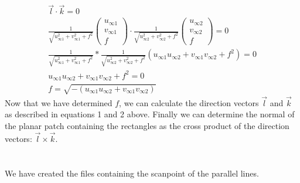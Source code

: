 \documentclass{article}
\begin{document}
\begin{align}
\vec{l} \cdot \vec{k}  = 0 \\
\frac{1}{\sqrt{u_{\infty 1}^2+v_{\infty 1}^2+f^2}}
\left(
\begin{array}{c}
u_{\infty 1} \\ v_{\infty 1} \\ f
\end{array}
\right) \cdot \frac{1}{\sqrt{u_{\infty 2}^2+v_{\infty 2}^2+f^2}}
\left(
\begin{array}{c}
u_{\infty 2} \\ v_{\infty 2} \\ f
\end{array}
\right)  = 0 \\
\frac{1}{\sqrt{u_{\infty 1}^2+v_{\infty 1}^2+f^2}} * \frac{1}{\sqrt{u_{\infty 2}^2+v_{\infty 2}^2+f^2}} (u_{\infty 1}u_{\infty 2}+v_{\infty 1}v_{\infty 2} + f^2) = 0 \\
u_{\infty 1}u_{\infty 2}+v_{\infty 1}v_{\infty 2} + f^2 = 0 \\
f = \sqrt{-(u_{\infty 1}u_{\infty 2}+v_{\infty 1}v_{\infty 2})}
\end{align}
Now that we have determined $f$, we can calculate the direction vectors $\vec{l}$ and $\vec{k}$ as described in equations 1 and 2 above. Finally we can determine the normal of the planar patch containing the rectangles as the cross product of the direction vectors: $\vec{l} \times \vec{k}$.

\section{}
We have created the files containing the scanpoint of the parallel lines.


\section{}
\end{document}
